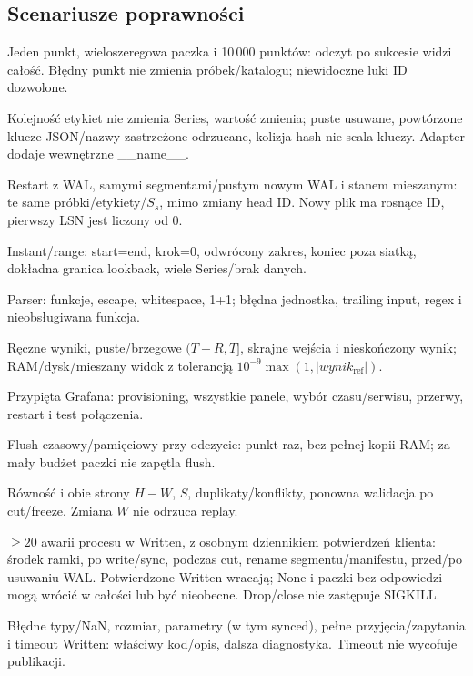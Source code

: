 \documentclass[11pt,a4paper]{article}
\begin{document}
\subsection{Scenariusze poprawności}
\begin{description}[style=multiline,leftmargin=16mm,font=\bfseries]
\item[T-01:] Jeden punkt, wieloszeregowa paczka i 10\,000 punktów:
odczyt po sukcesie widzi całość. Błędny punkt nie zmienia próbek/katalogu;
niewidoczne luki ID dozwolone.
\item[T-02:] Kolejność etykiet nie zmienia Series, wartość zmienia;
puste usuwane, powtórzone klucze JSON/nazwy zastrzeżone odrzucane,
kolizja hash nie scala kluczy. Adapter dodaje wewnętrzne \_\_name\_\_.
\item[T-03:] Restart z WAL, samymi segmentami/pustym nowym WAL i stanem
mieszanym: te same próbki/etykiety/$S_s$, mimo zmiany head ID.
Nowy plik ma rosnące ID, pierwszy LSN jest liczony od 0.
\item[T-04:] Instant/range: start=end, krok=0, odwrócony zakres,
koniec poza siatką, dokładna granica lookback, wiele Series/brak danych.
\item[T-05:] Parser: funkcje, escape, whitespace, 1+1;
błędna jednostka, trailing input, regex i nieobsługiwana funkcja.
\item[T-06:] Ręczne wyniki, puste/brzegowe $(T-R,T]$, skrajne wejścia
i nieskończony wynik; RAM/dysk/mieszany widok z tolerancją
$10^{-9}\max(1,|wynik_{\mathrm{ref}}|)$.
\item[T-07:] Przypięta Grafana: provisioning, wszystkie panele,
wybór czasu/serwisu, przerwy, restart i test połączenia.
\item[T-08:] Flush czasowy/pamięciowy przy odczycie: punkt raz,
bez pełnej kopii RAM; za mały budżet paczki nie zapętla flush.
\item[T-09:] Równość i obie strony $H-W$, $S$, duplikaty/konflikty,
ponowna walidacja po cut/freeze. Zmiana $W$ nie odrzuca replay.
\item[T-10:] $\geq20$ awarii procesu w Written, z osobnym dziennikiem
potwierdzeń klienta: środek ramki, po write/sync, podczas cut,
rename segmentu/manifestu, przed/po usuwaniu WAL.
Potwierdzone Written wracają; None i paczki bez odpowiedzi mogą
wrócić w całości lub być nieobecne. Drop/close nie zastępuje SIGKILL.
\item[T-11:] Błędne typy/NaN, rozmiar, parametry (w tym synced),
pełne przyjęcia/zapytania i timeout Written: właściwy kod/opis,
dalsza diagnostyka. Timeout nie wycofuje publikacji.

\end{description}
\end{document}
